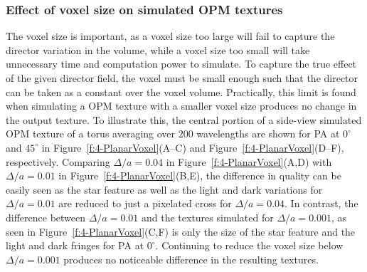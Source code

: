 \subsubsection{Effect of voxel size on simulated OPM textures}
The voxel size is important, as a voxel size too large will fail to capture the director variation in the volume, while a voxel size too small will take unnecessary time and computation power to simulate.
To capture the true effect of the given director field, the voxel must be small enough such that the director can be taken as a constant over the voxel volume.
Practically, this limit is found when simulating a OPM texture with a smaller voxel size produces no change in the output texture.
To illustrate this, the central portion of a side-view simulated OPM texture of a torus averaging over $200$ wavelengths are shown for PA at $0^{\circ}$ and $45^{\circ}$ in Figure~\ref{f:4-PlanarVoxel}(A--C) and Figure~\ref{f:4-PlanarVoxel}(D--F), respectively.
Comparing $\Delta /a = 0.04$ in Figure~\ref{f:4-PlanarVoxel}(A,D) with $\Delta /a = 0.01$ in Figure~\ref{f:4-PlanarVoxel}(B,E), the difference in quality can be easily seen as the star feature as well as the light and dark variations for $\Delta /a = 0.01$ are reduced to just a pixelated cross for $\Delta /a = 0.04$.
In contrast, the difference between $\Delta /a = 0.01$ and the textures simulated for $\Delta /a = 0.001$, as seen in Figure~\ref{f:4-PlanarVoxel}(C,F) is only the size of the star feature and the light and dark fringes for PA at $0^{\circ}$.
Continuing to reduce the voxel size below $\Delta /a = 0.001$ produces no noticeable difference in the resulting textures.

